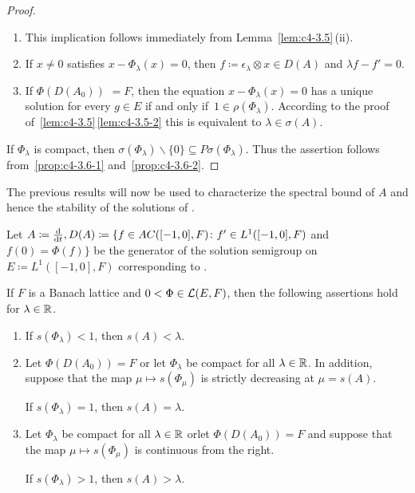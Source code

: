 \begin{proof}
\begin{enumerate}[\upshape (i), wide, labelindent=.25em] 
\item 
This implication follows immediately from Lemma~\ref{lem:c4-3.5}\,(ii).

\item 
If\/ $x \neq 0$ satisfies $x - \Phi_{\lambda}(x) = 0$, then $f \coloneq  \epsilon_{\lambda} \otimes x \in D(A)$ and $\lambda f - f' = 0$.

\item 
If\/ $\Phi(D(A_{0}))$ $= F$,  then the equation $x - \Phi_{\lambda}(x) = 0$ has a
unique solution for every $g \in E$ if and only if\, $1 \in \rho(\Phi_{\lambda})$. 
According to the proof of~\ref{lem:c4-3.5}\,\ref{lem:c4-3.5-2} this is equivalent to $\lambda \in \sigma(A)$.
\end{enumerate}
If\/ $\Phi_{\lambda}$ is compact, then $\sigma(\Phi_{\lambda})\backslash\{0\} \subseteq P\sigma(\Phi_{\lambda})$. Thus the assertion follows from~\ref{prop:c4-3.6-1} and~\ref{prop:c4-3.6-2}.
\end{proof}
The previous results will now be used to characterize the spectral bound of\/ $A$ and hence the stability of the solutions of .
\begin{theorem}\label{thm:c4-3.7}
Let $A \coloneq \frac{\mathop{}\!\mathrm{d}{}}{\mathop{}\!\mathrm{d}{t}}, D(A) \coloneq \{f \in AC([-1,0],F) \colon f' \in L^{1}([-1,0],F)$ and $f(0) = \Phi(f)\}$ be the generator of the solution semigroup on $E \coloneq L^{1}([-1,0],F)$ corresponding to . 

If\/ $F$ is a Banach lattice and $0 < \Phi \in \mathcal{L}(E,F)$, then the following assertions hold for $\lambda \in \mathbb{R}$.
\begin{enumerate}[\upshape (i)]
\item \label{thm:c4-3.7-1}
If\/ $s(\Phi_{\lambda}) < 1$, then $s(A) < \lambda$.
\item \label{thm:c4-3.7-2}
Let $\Phi(D(A_{0})) = F$ or let $\Phi_{\lambda}$ be compact for all $\lambda \in \mathbb{R}$. 
In addition, suppose that the map $\mu \mapsto s(\Phi_\mu)$ is strictly decreasing at $\mu = s(A)$. 

If\/ $s(\Phi_{\lambda}) = 1$, then $s(A) = \lambda$.
\item \label{thm:c4-3.7-3}
Let $\Phi_{\lambda}$ be compact for all $\lambda \in \mathbb{R}$ \quad or\quad let $\Phi(D(A_{0})) = F$ and suppose that the map $\mu \mapsto s(\Phi_\mu)$ is continuous from the right. 

If\/ $s(\Phi_{\lambda}) > 1$, then $s(A) > \lambda$.
\end{enumerate}
\end{theorem}
